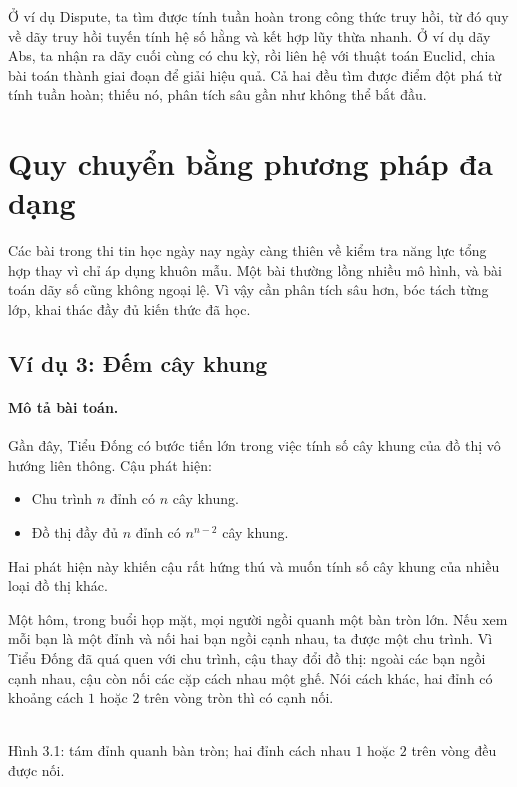 \documentclass[11pt]{article}
\begin{document}
Ở ví dụ Dispute, ta tìm được tính tuần hoàn trong công thức truy hồi, từ đó
quy về dãy truy hồi tuyến tính hệ số hằng và kết hợp lũy thừa nhanh. Ở ví dụ
dãy Abs, ta nhận ra dãy cuối cùng có chu kỳ, rồi liên hệ với thuật toán
Euclid, chia bài toán thành giai đoạn để giải hiệu quả. Cả hai đều tìm được
điểm đột phá từ tính tuần hoàn; thiếu nó, phân tích sâu gần như không thể bắt
đầu.

\section{Quy chuyển bằng phương pháp đa dạng}

Các bài trong thi tin học ngày nay ngày càng thiên về kiểm tra năng lực tổng
hợp thay vì chỉ áp dụng khuôn mẫu. Một bài thường lồng nhiều mô hình, và bài
toán dãy số cũng không ngoại lệ. Vì vậy cần phân tích sâu hơn, bóc tách từng
lớp, khai thác đầy đủ kiến thức đã học.

\subsection{Ví dụ 3: Đếm cây khung}

\paragraph{Mô tả bài toán.}
Gần đây, Tiểu Đống có bước tiến lớn trong việc tính số cây khung của đồ thị vô
hướng liên thông. Cậu phát hiện:
\begin{itemize}
  \item Chu trình $n$ đỉnh có $n$ cây khung.
  \item Đồ thị đầy đủ $n$ đỉnh có $n^{n-2}$ cây khung.
\end{itemize}
Hai phát hiện này khiến cậu rất hứng thú và muốn tính số cây khung của nhiều
loại đồ thị khác.

Một hôm, trong buổi họp mặt, mọi người ngồi quanh một bàn tròn lớn. Nếu xem
mỗi bạn là một đỉnh và nối hai bạn ngồi cạnh nhau, ta được một chu trình. Vì
Tiểu Đống đã quá quen với chu trình, cậu thay đổi đồ thị: ngoài các bạn ngồi
cạnh nhau, cậu còn nối các cặp cách nhau một ghế. Nói cách khác, hai đỉnh có
khoảng cách $1$ hoặc $2$ trên vòng tròn thì có cạnh nối.

\begin{center}
\\
\small Hình 3.1: tám đỉnh quanh bàn tròn; hai đỉnh cách nhau $1$ hoặc $2$
trên vòng đều được nối.
\end{center}
\end{document}
